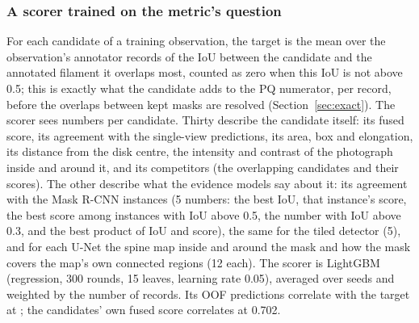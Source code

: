 \documentclass[sigconf]{acmart}
\begin{document}
\subsubsection{A scorer trained on the metric's question}\label{sec:scorer}
For each candidate of a training observation, the target is the mean over the observation's annotator records of the IoU between the candidate and the annotated filament it overlaps most, counted as zero when this IoU is not above 0.5; this is exactly what the candidate adds to the PQ numerator, per record, before the overlaps between kept masks are resolved (Section~\ref{sec:exact}). The scorer sees  numbers per candidate. Thirty describe the candidate itself: its fused score, its agreement with the single-view predictions, its area, box and elongation, its distance from the disk centre, the intensity and contrast of the photograph inside and around it, and its competitors (the overlapping candidates and their scores). The other  describe what the evidence models say about it: its agreement with the Mask R-CNN instances (5 numbers: the best IoU, that instance's score, the best score among instances with IoU above 0.5, the number with IoU above 0.3, and the best product of IoU and score), the same for the tiled detector (5), and for each U-Net the spine map inside and around the mask and how the mask covers the map's own connected regions (12 each). The scorer is LightGBM \cite{ke2017lightgbm} (regression, 300 rounds, 15 leaves, learning rate 0.05), averaged over  seeds and weighted by the number of records. Its OOF predictions correlate with the target at ; the candidates' own fused score correlates at 0.702.
\end{document}
